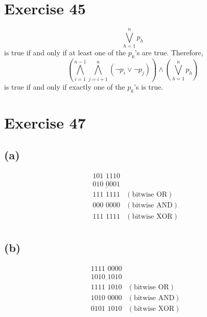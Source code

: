 \documentclass{article}
\begin{document}
\pagebreak

\section{Exercise 45}
\begin{equation}
	\bigvee_{h=1}^n p_h
\end{equation}
is true if and only if at least one of the $p_k$'s are true.  Therefore,
\begin{equation}
	\left( \bigwedge_{i=1}^{n-1} \bigwedge_{j=i+1}^n (\neg p_i \lor \neg p_j) \right) \land \left( \bigvee_{h=1}^n p_h \right)
\end{equation}
is true if and only if exactly one of the $p_k$'s is true.

\pagebreak

\section{Exercise 47}
\subsection{(a)}
\begin{align*}
	 & \text{101 1110}             &                      \\
	 & \underline{\text{010 0001}} &                      \\
	 & \text{111 1111}             & (\text{bitwise OR})  \\
	 & \text{000 0000}             & (\text{bitwise AND}) \\
	 & \text{111 1111}             & (\text{bitwise XOR}) \\
\end{align*}

\subsection{(b)}
\begin{align*}
	 & \text{1111 0000}             &                      \\
	 & \underline{\text{1010 1010}} &                      \\
	 & \text{1111 1010}             & (\text{bitwise OR})  \\
	 & \text{1010 0000}             & (\text{bitwise AND}) \\
	 & \text{0101 1010}             & (\text{bitwise XOR}) \\
\end{align*}
\end{document}
